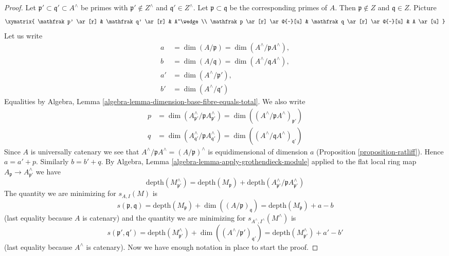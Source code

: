 \begin{proof}
Let $\mathfrak p' \subset \mathfrak q' \subset A^\wedge$
be primes with $\mathfrak p' \not \in Z^\wedge$ and
$\mathfrak q' \in Z^\wedge$. Let $\mathfrak p \subset \mathfrak q$
be the corresponding primes of $A$. Then $\mathfrak p \not \in Z$
and $\mathfrak q \in Z$. Picture
$$
\xymatrix{
\mathfrak p' \ar[r] & \mathfrak q' \ar[r] & A^\wedge \\
\mathfrak p \ar[r] \ar@{-}[u] &
\mathfrak q \ar[r] \ar@{-}[u] & A \ar[u]
}
$$
Let us write
\begin{align*}
a & = \dim(A/\mathfrak p) = \dim(A^\wedge/\mathfrak pA^\wedge),\\
b & = \dim(A/\mathfrak q) = \dim(A^\wedge/\mathfrak qA^\wedge),\\
a' & = \dim(A^\wedge/\mathfrak p'),\\
b' & = \dim(A^\wedge/\mathfrak q')
\end{align*}
Equalities by
Algebra, Lemma \ref{algebra-lemma-dimension-base-fibre-equals-total}.
We also write
\begin{align*}
p & = \dim(A^\wedge_{\mathfrak p'}/\mathfrak p A^\wedge_{\mathfrak p'}) =
\dim((A^\wedge/\mathfrak p A^\wedge)_{\mathfrak p'}) \\
q & = \dim(A^\wedge_{\mathfrak q'}/\mathfrak p A^\wedge_{\mathfrak q'}) =
\dim((A^\wedge/\mathfrak q A^\wedge)_{\mathfrak q'})
\end{align*}
Since $A$ is universally catenary we see that
$A^\wedge/\mathfrak pA^\wedge = (A/\mathfrak p)^\wedge$
is equidimensional of dimension $a$ (Proposition \ref{proposition-ratliff}).
Hence $a = a' + p$. Similarly $b = b' + q$.
By Algebra, Lemma \ref{algebra-lemma-apply-grothendieck-module}
applied to the flat local ring map
$A_\mathfrak p \to A^\wedge_{\mathfrak p'}$
we have
$$
\text{depth}(M^\wedge_{\mathfrak p'})
=
\text{depth}(M_\mathfrak p) +
\text{depth}(A^\wedge_{\mathfrak p'} / \mathfrak p A^\wedge_{\mathfrak p'})
$$
The quantity we are minimizing for $s_{A, I}(M)$ is
$$
s(\mathfrak p, \mathfrak q) =
\text{depth}(M_\mathfrak p) + \dim((A/\mathfrak p)_\mathfrak q) =
\text{depth}(M_\mathfrak p) + a - b
$$
(last equality because $A$ is catenary)
and the quantity we are minimizing for $s_{A^\wedge, I^\wedge}(M^\wedge)$
is
$$
s(\mathfrak p', \mathfrak q') =
\text{depth}(M^\wedge_{\mathfrak p'}) +
\dim((A^\wedge/\mathfrak p')_{\mathfrak q'}) =
\text{depth}(M^\wedge_{\mathfrak p'}) + a' - b'
$$
(last equality because $A^\wedge$ is catenary).
Now we have enough notation in place to start the proof.


\end{proof}

